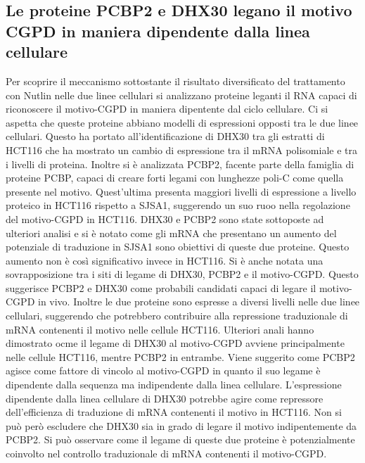   \subsection{Le proteine PCBP2 e DHX30 legano il motivo CGPD in maniera dipendente dalla linea cellulare}
  Per scoprire il meccanismo sottostante il risultato diversificato del trattamento con Nutlin nelle due linee cellulari si analizzano proteine leganti il RNA capaci di riconoscere il motivo-CGPD in maniera dipentente dal ciclo cellulare.
  Ci si aspetta che queste proteine abbiano modelli di espressioni opposti tra le due linee cellulari.
  Questo ha portato all'identificazione di DHX30 tra gli estratti di HCT116 che ha mostrato un cambio di espressione tra il mRNA polisomiale e tra i livelli di proteina.
  Inoltre si \`e analizzata PCBP2, facente parte della famiglia di proteine PCBP, capaci di creare forti legami con lunghezze poli-C come quella presente nel motivo.
  Quest'ultima presenta maggiori livelli di espressione a livello proteico in HCT116 rispetto a SJSA1, suggerendo un suo ruoo nella regolazione del motivo-CGPD in HCT116.
  DHX30 e PCBP2 sono state sottoposte ad ulteriori analisi e si \`e notato come gli mRNA che presentano un aumento del potenziale di traduzione in SJSA1 sono obiettivi di queste due proteine.
  Questo aumento non \`e cos\`i significativo invece in HCT116.
  Si \`e anche notata una sovrapposizione tra i siti di legame di DHX30, PCBP2 e il motivo-CGPD.
  Questo suggerisce PCBP2 e DHX30 come probabili candidati capaci di legare il motivo-CGPD in vivo.
  Inoltre le due proteine sono espresse a diversi livelli nelle due linee cellulari, suggerendo che potrebbero contribuire alla repressione traduzionale di mRNA contenenti il motivo nelle cellule HCT116.
  Ulteriori anali hanno dimostrato ocme il legame di DHX30 al motivo-CGPD avviene principalmente nelle cellule HCT116, mentre PCBP2 in entrambe.
  Viene suggerito come PCBP2 agisce come fattore di vincolo al motivo-CGPD in quanto il suo legame \`e dipendente dalla sequenza ma indipendente dalla linea cellulare.
  L'espressione dipendente dalla linea cellulare di DHX30 potrebbe agire come repressore dell'efficienza di traduzione di mRNA contenenti il motivo in HCT116.
  Non si pu\`o per\`o escludere che DHX30 sia in grado di legare il motivo indipentemente da PCBP2.
  Si pu\`o osservare come il legame di queste due proteine \`e potenzialmente coinvolto nel controllo traduzionale di mRNA contenenti il motivo-CGPD.





